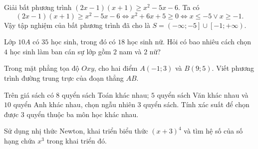 

\begin{bt}%
	Giải bất phương trình  $(2x-1)(x+1)\geq x^2-5 x-6$.
	\loigiai
	{ Ta có
			$$(2x-1)(x+1)\geq x^2-5 x-6\Leftrightarrow x^2+6x+5\geq 0\Leftrightarrow x\le -5 \vee x\geq -1.$$
			Vậy tập nghiệm của bất phương trình đã cho là $S=\left( -\infty ;-5 \right]\cup \left[ -1;+\infty  \right)$.
	}
\end{bt}
\begin{bt}%
	Lớp $10A$ có $35$ học sinh, trong đó có $18$ học sinh nữ. Hỏi có bao nhiêu cách chọn $4$ học sinh làm ban cán sự lớp gồm $ 2 $ nam và $ 2 $ nữ? 
\end{bt}
\begin{bt}%
	Trong mặt phẳng tọa độ $Oxy$, cho hai điểm $A(-1; 3)$ và $B(9; 5)$. Viết phương trình đường trung trực của đoạn thẳng $AB$.
\end{bt}
\begin{bt}%
Trên giá sách có $ 8 $ quyển sách Toán khác nhau; $ 5 $ quyển sách Văn khác nhau và $ 10 $ quyển Anh khác nhau, chọn ngẫu nhiên $ 3 $ quyển sách. Tính xác suất để chọn được $ 3 $ quyển thuộc ba môn học khác nhau.
\end{bt}
\begin{bt}%
	Sử dụng nhị thức Newton, khai triển biểu thức $(x+3)^4$ và tìm hệ số của số hạng chứa $x^3$ trong khai triển đó.
\end{bt}

